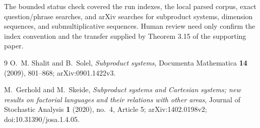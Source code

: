 \documentclass[11pt]{article}
\begin{document}
The bounded status check covered the run indexes, the local parsed corpus,
exact question/phrase searches, and arXiv searches for subproduct systems,
dimension sequences, and submultiplicative sequences.  Human review need
only confirm the index convention and the transfer supplied by Theorem 3.15
of the supporting paper.

\begin{thebibliography}{9}
O.~M. Shalit and B.~Solel,
\emph{Subproduct systems}, Documenta Mathematica \textbf{14} (2009),
801--868; arXiv:0901.1422v3.

M.~Gerhold and M.~Skeide,
\emph{Subproduct systems and Cartesian systems; new results on factorial
languages and their relations with other areas},
Journal of Stochastic Analysis \textbf{1} (2020), no.~4, Article 5;
arXiv:1402.0198v2; doi:10.31390/josa.1.4.05.
\end{thebibliography}
\end{document}
